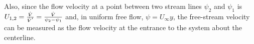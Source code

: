 \documentclass[12pt]{article}
\makeatletter
\DeclareRobustCommand{\volume}{\text{\volumedash}V}
\newcommand{\volumedash}{%
	\makebox[0pt][l]{%
		\ooalign{\hfil\hphantom{$\m@th V$}\hfil\cr\kern0.08em--\hfil\cr}%
	}%
}
\makeatother
\begin{document}
	Also, since the flow velocity at a point between two stream lines $\psi_{2}$ and $\psi_{1}$ is $U_{1,2}= \frac{\dot{\volume}}{\dot{\volume}'}=\frac{\dot{\volume}}{\psi_{2}-\psi_{1}}$ and, in uniform free flow, $\psi=U_{\infty}y$, the free-stream velocity can be measured as the flow velocity at the entrance to the system about the centerline.
\end{document}
